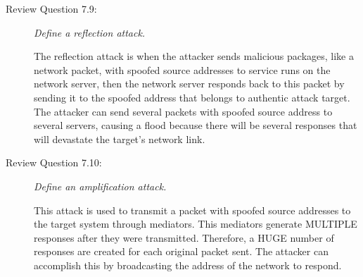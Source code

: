 \documentclass[12pt]{article}
\newcommand\tab[1][1cm]{\hspace*{#1}}
\begin{document}
\renewcommand{\headrulewidth}{0.4pt}
\vspace{-3mm}



\begin{description}
\item[Review Question 7.9:] {\color{grey}\textit{Define a reflection attack.}} \par
\tab The reflection attack is when the attacker sends malicious packages, like a network packet, with spoofed source addresses to service runs on the network server, then the network server responds back to this packet by sending it to the spoofed address that belongs to authentic attack target. The attacker can send several packets with spoofed source address to several servers, causing a flood because there will be several responses that will devastate the target's network link.  

\item[Review Question 7.10:] {\color{grey}\textit{Define an amplification attack.}} \par
\tab This  attack is used to transmit a packet with spoofed source addresses to the target system through mediators. This mediators generate MULTIPLE responses after they were transmitted. Therefore, a HUGE number of responses are created for each original packet sent. The attacker can accomplish this by broadcasting the address of the network to respond.  
\end{description}
\end{document}

